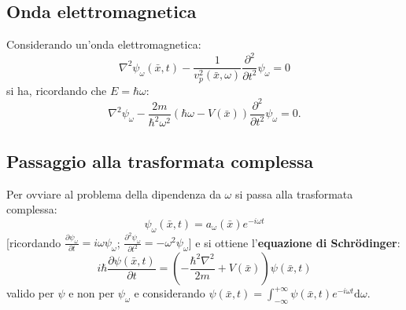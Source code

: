 \subsection{Onda elettromagnetica} %
Considerando un'onda elettromagnetica:
\begin{equation}
\nabla ^2\psi_{\omega} \left(\bar x, t\right)-\frac{1}{v_p^2(\bar x, \omega)}\frac{\partial ^2}{\partial  t^2}\psi_{\omega} =0
\end{equation}
si ha, ricordando che $E=\hbar \omega$:
\begin{equation}
\nabla ^2\psi_{\omega} -\frac{2m}{\hbar ^2\omega ^2}\left(\hbar \omega -V\left(\bar x\right)\right)\frac{\partial  ^2}{\partial t^2}\psi_{\omega} =0.
\end{equation}

\subsection{Passaggio alla trasformata complessa} %
Per ovviare al problema della dipendenza da $\omega $ si passa alla trasformata complessa:
\begin{equation}
\psi_{\omega} \left(\bar x, t\right)=a_{\omega }\left(\bar x\right)e^{-i\omega t}
\end{equation}
[ricordando $\frac{\partial \psi_{\omega}}{\partial t}=i\omega \psi_{\omega}$; $\frac{\partial^2 \psi_{\omega}}{\partial t^2}=-\omega^2 \psi_{\omega}$]
e si ottiene l'\textbf{equazione di Schrödinger}:
\begin{equation}
\label{eq:schrodinger}
i\hbar \frac{\partial \psi \left(\bar x, t\right)}{\partial  t}=\left(-\frac{\hbar ^2\nabla ^2}{2m}+V\left(\bar x\right)\right)\psi \left(\bar x, t\right)
\end{equation}
valido per $\psi$ e non per $\psi_{\omega}$ e considerando $\psi \left(\bar x, t\right)=\int_{-\infty }^{+\infty }{\psi \left(\bar x, t\right) e^{-i\omega t} \textrm{d}\omega}$.